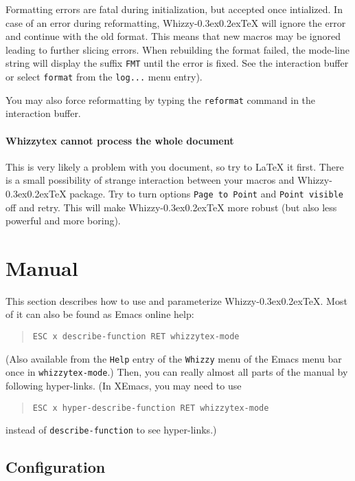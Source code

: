 \documentclass{article}
\makeatletter
\let \lst \verb
\def \whizzy {{Whizzy\kern -0.3ex\raise 0.2ex\hbox{\let \@\relax\TeX}}}
\makeatother
\begin{document}
Formatting errors are fatal during initialization, but accepted once
intialized. In case of an error during reformatting, {\whizzy} will ignore
the error and continue with the old format.  This means that new macros may
be ignored leading to further slicing errors. When rebuilding the format
failed, the mode-line string will display the suffix \lst"FMT" until the
error is fixed.  See the interaction buffer or select \lst"format" from the
\lst"log..." menu entry).

You may also force reformatting by typing the \lst"reformat" command
in the interaction buffer. 


\paragraph {Whizzytex cannot process the whole document}

This is very likely a problem with you document, so try to {\LaTeX} it 
first. There is a small possibility of strange interaction between
your macros and {\whizzy} package. Try to turn options 
{\tt Page to Point} and {\tt Point visible} off and retry. 
This will make {\whizzy} more robust (but also less powerful and more
boring). 


\section {\label{manual}Manual} 

This section describes how to use and
parameterize {\whizzy}. Most of it can also be found as Emacs online help:
\begin{quote}
\begin{verbatim}
ESC x describe-function RET whizzytex-mode
\end{verbatim}
\end{quote}
(Also available from the {\tt Help} entry of the {\tt Whizzy} menu of the Emacs
menu bar once in {\tt whizzytex-mode}.)  Then, you can really almost all
parts of the manual by following hyper-links. (In XEmacs, you may need to 
use 
\begin{quote}
\begin{verbatim}
ESC x hyper-describe-function RET whizzytex-mode
\end{verbatim}
\end{quote}
instead of \lst"describe-function" to see hyper-links.)


\subsection {Configuration} 
\end{document}

